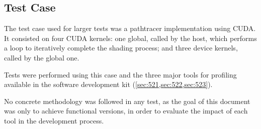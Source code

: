 \subsection{Test Case}
\label{sec:test:case}


The test case used for larger tests was a pathtracer implementation using CUDA. It consisted on four CUDA kernels: one global, called by the host, which performs a loop to iteratively complete the shading process; and three device kernels, called by the global one.

Tests were performed using this case and the three major tools for profiling available in the \nvidia software development kit (\cref{sec:521,sec:522,sec:523}).

No concrete methodology was followed in any test, as the goal of this document was only to achieve functional versions, in order to evaluate the impact of each tool in the development process.